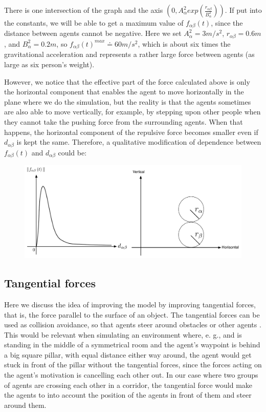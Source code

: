 There is one intersection of the graph and the axis $ \left( 0, A_{\alpha}^{2} exp\left( \frac{r_{\alpha\beta} }{B_{\alpha}^{2}}\right)  \right) $. 
If put into the constants, we will be able to get a maximum value of $ f_{\alpha\beta}(t) $, 
since the distance between agents cannot be negative. Here we set $ A_{\alpha}^{2} = 3 m/s^{2} $, 
$ r_{\alpha\beta} = 0.6 m $, and $ B_{\alpha}^{2} = 0.2 m $, so $ f_{\alpha\beta}(t)^{max} \doteq 60 m/s^{2} $, 
which is about six times the gravitational acceleration and represents a rather 
large force between agents (as large as six person's weight).

However, we notice that the effective part of the force calculated above is only the horizontal 
component that enables the agent to move horizontally in the plane where we do the simulation, 
but the reality is that the agents sometimes are also able to move vertically, for example, 
by stepping upon other people when they cannot take the pushing force from the surrounding agents. 
When that happens, the horizontal component of the repulsive force becomes smaller even if 
$d_{\alpha\beta}$ is kept the same.	
Therefore, a qualitative modification of dependence between $ f_{\alpha\beta}(t) $ 
and $ d_{\alpha\beta} $ could be:

\begin{figure}[hb]   
\centering
    {\includegraphics[scale=0.35]{Figures/ForceOverlapping.pdf}} 
    \caption{}
    \label{forceoverlapping}
\end{figure}
 
\subsection{Tangential forces}
Here we discuss the idea of improving the model by improving tangential forces, that is, the force parallel to the surface of an object.
The tangential forces can be used as collision avoidance, so that agents steer around obstacles or other agents \cite{tang}.
This would be relevant when simulating an environment where, e. g., and is standing in the middle of a symmetrical room and the agent's waypoint
is behind a big square pillar, with equal distance either way around, the agent would get stuck in front of the pillar without the tangential forces,
since the forces acting on the agent's motivation is cancelling each other out. 
In our case where two groups of agents are crossing each other in a corridor, the tangential force would make the agents to into account
the position of the agents in front of them and steer around them.

